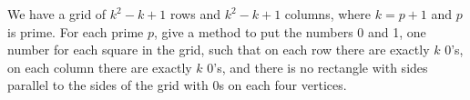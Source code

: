 We have a grid of $k^2-k+1$ rows and $k^2-k+1$ columns, where $k=p+1$ and $p$ is prime. For each prime $p$,  give a method to put the numbers 0 and 1, one number for each square in the grid, such that on each row there are exactly $k$ 0's, on each column there are exactly $k$ 0's, and there is no rectangle with sides parallel to the sides of the grid with 0s on each four vertices.